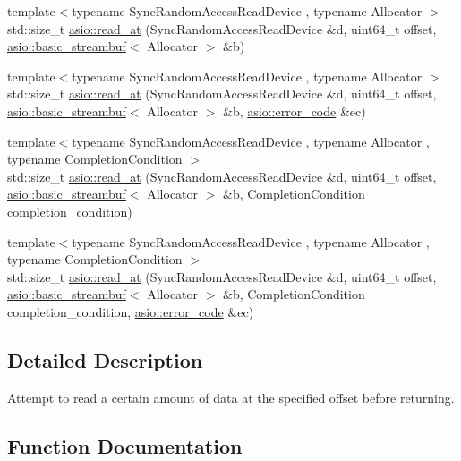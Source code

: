 \begin{DoxyCompactItemize}
\item 
{\footnotesize template$<$typename Sync\+Random\+Access\+Read\+Device , typename Allocator $>$ }\\std\+::size\+\_\+t \hyperlink{group__read__at_ga301406c670bc22190df6e8628cbf0037}{asio\+::read\+\_\+at} (Sync\+Random\+Access\+Read\+Device \&d, uint64\+\_\+t offset, \hyperlink{classasio_1_1basic__streambuf}{asio\+::basic\+\_\+streambuf}$<$ Allocator $>$ \&b)
\item 
{\footnotesize template$<$typename Sync\+Random\+Access\+Read\+Device , typename Allocator $>$ }\\std\+::size\+\_\+t \hyperlink{group__read__at_ga4511bad893697fc58d379d6e00aa84ff}{asio\+::read\+\_\+at} (Sync\+Random\+Access\+Read\+Device \&d, uint64\+\_\+t offset, \hyperlink{classasio_1_1basic__streambuf}{asio\+::basic\+\_\+streambuf}$<$ Allocator $>$ \&b, \hyperlink{classasio_1_1error__code}{asio\+::error\+\_\+code} \&ec)
\item 
{\footnotesize template$<$typename Sync\+Random\+Access\+Read\+Device , typename Allocator , typename Completion\+Condition $>$ }\\std\+::size\+\_\+t \hyperlink{group__read__at_ga0126c00568f324b47c24b494c97ece14}{asio\+::read\+\_\+at} (Sync\+Random\+Access\+Read\+Device \&d, uint64\+\_\+t offset, \hyperlink{classasio_1_1basic__streambuf}{asio\+::basic\+\_\+streambuf}$<$ Allocator $>$ \&b, Completion\+Condition completion\+\_\+condition)
\item 
{\footnotesize template$<$typename Sync\+Random\+Access\+Read\+Device , typename Allocator , typename Completion\+Condition $>$ }\\std\+::size\+\_\+t \hyperlink{group__read__at_ga926222f6d0bb8a716a17161a1eb725aa}{asio\+::read\+\_\+at} (Sync\+Random\+Access\+Read\+Device \&d, uint64\+\_\+t offset, \hyperlink{classasio_1_1basic__streambuf}{asio\+::basic\+\_\+streambuf}$<$ Allocator $>$ \&b, Completion\+Condition completion\+\_\+condition, \hyperlink{classasio_1_1error__code}{asio\+::error\+\_\+code} \&ec)
\end{DoxyCompactItemize}


\subsection{Detailed Description}
Attempt to read a certain amount of data at the specified offset before returning. 



\subsection{Function Documentation}
\hypertarget{group__read__at_ga88604242259da9fb0bacf3c4f0cc0002}{}
